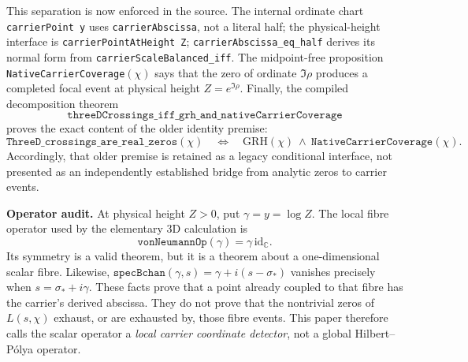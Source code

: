 \documentclass[11pt]{article}
\theoremstyle{definition}
\begin{document}
This separation is now enforced in the source.  The internal ordinate chart
\texttt{carrierPoint y} uses \texttt{carrierAbscissa}, not a literal half;
the physical-height interface is \texttt{carrierPointAtHeight Z};
\texttt{carrierAbscissa\_eq\_half} derives its normal form from
\texttt{carrierScaleBalanced\_iff}.  The midpoint-free proposition
\texttt{NativeCarrierCoverage}\((\chi)\) says that the zero of ordinate
\(\Im\rho\) produces a completed focal event at physical height
\(Z=e^{\Im\rho}\).  Finally, the compiled decomposition theorem
\[
\texttt{threeDCrossings\_iff\_grh\_and\_nativeCarrierCoverage}
\]
proves the exact content of the older identity premise:
\[
 \texttt{ThreeD\_crossings\_are\_real\_zeros}(\chi)
 \quad\Longleftrightarrow\quad
 \mathrm{GRH}(\chi)\ \wedge\
 \texttt{NativeCarrierCoverage}(\chi).
\]
Accordingly, that older premise is retained as a legacy conditional interface,
not presented as an independently established bridge from analytic zeros to
carrier events.

\medskip
\noindent\textbf{Operator audit.}  At physical height $Z>0$, put
\(\gamma=y=\log Z\).  The local fibre operator used by the elementary 3D
calculation is
\[
 \texttt{vonNeumannOp}(\gamma)=\gamma\,\mathrm{id}_{\mathbb C}.
\]
Its symmetry is a valid theorem, but it is a theorem about a one-dimensional
scalar fibre.  Likewise,
\(\texttt{specBchan}(\gamma,s)=\gamma+i(s-\sigma_*)\) vanishes precisely when
\(s=\sigma_*+i\gamma\).  These facts prove that a point already coupled to
that fibre has the carrier's derived abscissa.  They do not prove that the
nontrivial zeros of \(L(s,\chi)\) exhaust, or are exhausted by, those fibre
events.  This paper therefore calls the scalar operator a \emph{local carrier
coordinate detector}, not a global Hilbert--P\'olya operator.
\end{document}
